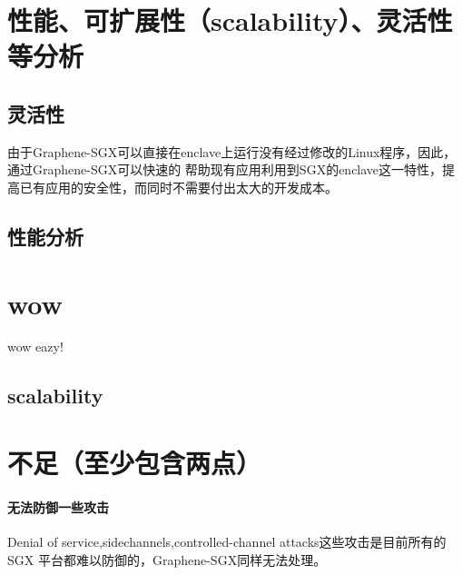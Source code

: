 \documentclass{article}
\begin{document}
\section{性能、可扩展性（scalability）、灵活性等分析}
\subsection{灵活性}
由于Graphene-SGX可以直接在enclave上运行没有经过修改的Linux程序，因此，通过Graphene-SGX可以快速的
帮助现有应用利用到SGX的enclave这一特性，提高已有应用的安全性，而同时不需要付出太大的开发成本。


\subsection{性能分析}
\section{wow}wow
eazy!
\subsection{scalability}


\section{不足（至少包含两点）}
\paragraph{无法防御一些攻击}
Denial of service,sidechannels,controlled-channel attacks这些攻击是目前所有的 SGX 平台都难以防御的，Graphene-SGX同样无法处理。

\printbibliography
\end{document}
